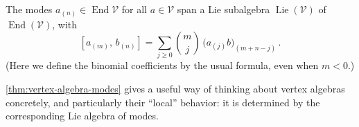 \documentclass[12pt,letterpaper,reqno]{amsart}
\numberwithin{equation}{section}
\newcommand{\e}{{\mathrm e}}
\newcommand{\vertex}{\mathcal{V}}
\DeclareMathOperator{\End}{End}
\DeclareMathOperator{\Lie}{Lie}
\begin{document}


\begin{thm} \label{thm:vertex-algebra-modes} The modes $a_{(n)} \in \End \vertex$ 
for all $a \in \vertex$ span 
a Lie subalgebra $\Lie(\vertex)$ of $\End(\vertex)$, with
\begin{equation} \label{eq:mode-algebra}
[a_{(m)},\,b_{(n)}]
= \sum_{j\ge 0} \binom{m}{j}\,\bigl(a_{(j)}b\bigr)_{(m+n-j)} \, .
\end{equation}
(Here we define the binomial coefficients
by the usual formula, even when $m < 0$.)
\end{thm}
\autoref{thm:vertex-algebra-modes} 
gives a useful way of thinking about vertex algebras
concretely, and particularly their ``local'' behavior: 
it is determined by the corresponding Lie algebra of modes.
\end{document}
